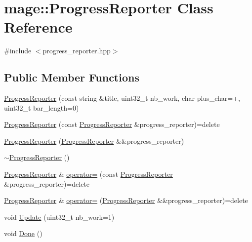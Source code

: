 \hypertarget{classmage_1_1_progress_reporter}{}\section{mage\+:\+:Progress\+Reporter Class Reference}
\label{classmage_1_1_progress_reporter}


{\ttfamily \#include $<$progress\+\_\+reporter.\+hpp$>$}

\subsection*{Public Member Functions}
\begin{DoxyCompactItemize}
\item 
\hyperlink{classmage_1_1_progress_reporter_ab105fa7ac8fb1c53c60deab107c26f74}{Progress\+Reporter} (const string \&title, uint32\+\_\+t nb\+\_\+work, char plus\+\_\+char=\textquotesingle{}+\textquotesingle{}, uint32\+\_\+t bar\+\_\+length=0)
\item 
\hyperlink{classmage_1_1_progress_reporter_a59c1ca6e4c0d480a1726d79ef6d42e74}{Progress\+Reporter} (const \hyperlink{classmage_1_1_progress_reporter}{Progress\+Reporter} \&progress\+\_\+reporter)=delete
\item 
\hyperlink{classmage_1_1_progress_reporter_a5e7036f1a90e019fc75b6afca4459a78}{Progress\+Reporter} (\hyperlink{classmage_1_1_progress_reporter}{Progress\+Reporter} \&\&progress\+\_\+reporter)
\item 
\hyperlink{classmage_1_1_progress_reporter_aa543239c6dd4474a77cf4cf6904c1b26}{$\sim$\+Progress\+Reporter} ()
\item 
\hyperlink{classmage_1_1_progress_reporter}{Progress\+Reporter} \& \hyperlink{classmage_1_1_progress_reporter_a7bc52147f6d2e30d897f512f910c8917}{operator=} (const \hyperlink{classmage_1_1_progress_reporter}{Progress\+Reporter} \&progress\+\_\+reporter)=delete
\item 
\hyperlink{classmage_1_1_progress_reporter}{Progress\+Reporter} \& \hyperlink{classmage_1_1_progress_reporter_aba75cd5ea2d9faae4264b844f857e260}{operator=} (\hyperlink{classmage_1_1_progress_reporter}{Progress\+Reporter} \&\&progress\+\_\+reporter)=delete
\item 
void \hyperlink{classmage_1_1_progress_reporter_a0a5f99f15e4152da9a3d6aadd888244a}{Update} (uint32\+\_\+t nb\+\_\+work=1)
\item 
void \hyperlink{classmage_1_1_progress_reporter_a11d758647ac2082bc296ab53a7454eaa}{Done} ()
\end{DoxyCompactItemize}
